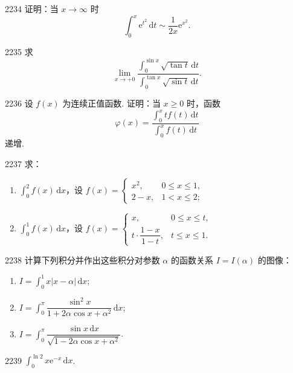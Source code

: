 \begin{prob}[M]{2234}
证明：当 $x\to \infty$ 时
\[ \int_0^x \mathrm{e}^{t^2}\,\mathrm{d}t \sim \frac{1}{2x}\mathrm{e}^{x^2}. \]
\end{prob}

\begin{prob}[M]{2235}
求
\[ \lim_{x\to +0} \frac{\int_0^{\sin x} \sqrt{\tan t}\,\mathrm{d}t}{\int_0^{\tan x} \sqrt{\sin t}\,\mathrm{d}t}. \]
\end{prob}

\begin{prob}[M]{2236}
设 $f(x)$ 为连续正值函数. 证明：当 $x \geqslant 0$ 时，函数
\[ \varphi(x) = \frac{\int_0^x t f(t)\,\mathrm{d}t}{\int_0^x f(t)\,\mathrm{d}t} \]
递增.
\end{prob}

\begin{prob}[M]{2237}
求：
\begin{enumerate}[label=(\alph*), itemsep=2pt, topsep=3pt]
  \item $\int_0^2 f(x)\,\mathrm{d}x$，设 $f(x) = \begin{cases} x^2, & 0 \leqslant x \leqslant 1, \\ 2-x, & 1 < x \leqslant 2; \end{cases}$
  \item $\int_0^1 f(x)\,\mathrm{d}x$，设 $f(x) = \begin{cases} x, & 0 \leqslant x \leqslant t, \\ t \cdot \dfrac{1-x}{1-t}, & t \leqslant x \leqslant 1. \end{cases}$
\end{enumerate}
\end{prob}

\begin{prob}[L]{2238}
计算下列积分并作出这些积分对参数 $\alpha$ 的函数关系 $I = I(\alpha)$ 的图像：
\begin{enumerate}[label=(\alph*), itemsep=2pt, topsep=3pt]
  \item $I = \int_0^1 x|x-\alpha|\,\mathrm{d}x$;
  \item $I = \int_0^\pi \dfrac{\sin^2 x}{1 + 2\alpha \cos x + \alpha^2}\,\mathrm{d}x$;
  \item $I = \int_0^\pi \dfrac{\sin x\,\mathrm{d}x}{\sqrt{1 - 2\alpha \cos x + \alpha^2}}$.
\end{enumerate}
\end{prob}


\begin{prob}[S]{2239}
$\int_0^{\ln 2} x\mathrm{e}^{-x}\,\mathrm{d}x$.
\end{prob}

